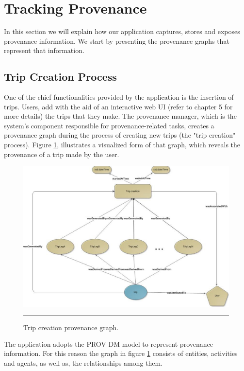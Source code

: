 \section{Tracking Provenance}

In this section we will explain how our application captures, stores and exposes provenance information. We start by presenting the provenance graphs that represent that information.

\subsection{Trip Creation Process}

One of the chief functionalities provided by the application is the insertion of trips. Users, add with the aid of an interactive web UI (refer to chapter 5 for more details) the trips that they make.
The provenance manager, which is the system's component responsible for provenance-related tasks, creates a provenance graph during the process of creating new trips (the "trip creation" process). Figure \ref{fig:provTripCreationGraph}, illustrates a visualized form of that graph, which reveals the provenance of a trip made by the user.

\begin{figure}[htbp]
	\centering
		\includegraphics[scale=0.60]{./Figures/chapter3/figure1.pdf}
		\rule{35em}{0.5pt}
	\caption[Trip creation provenance graph]{Trip creation provenance graph.}
	\label{fig:provTripCreationGraph}
\end{figure}

The application adopts the PROV-DM model to represent provenance information. For this reason the graph in figure \ref{fig:provTripCreationGraph} consists of entities, activities and agents, as well as, the relationships among them.

